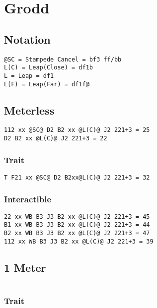 \documentclass[main.tex]{subfiles}
\begin{document}
\chapter{Grodd}

\section{Notation}
\begin{lstlisting}[language=FG]
@SC = Stampede Cancel = bf3 ff/bb
L(C) = Leap(Close) = df1b
L = Leap = df1
L(F) = Leap(Far) = df1f@
\end{lstlisting}
\section{Meterless}


\begin{lstlisting}[language=FG]
112 xx @SC@ D2 B2 xx @L(C)@ J2 221+3 = 25
D2 B2 xx @L(C)@ J2 221+3 = 22
\end{lstlisting}

\subsection{Trait}

\begin{lstlisting}[language=FG]
T F21 xx @SC@ D2 B2xx@L(C)@ J2 221+3 = 32
\end{lstlisting}


\subsection{Interactible}
\begin{lstlisting}[language=FG]
22 xx WB B3 J3 B2 xx @L(C)@ J2 221+3 = 45
B1 xx WB B3 J3 B2 xx @L(C)@ J2 221+3 = 44
B2 xx WB B3 J3 B2 xx @L(C)@ J2 221+3 = 47
112 xx WB B3 J3 B2 xx @L(C)@ J2 221+3 = 39
\end{lstlisting}

\section{1 Meter}


\begin{lstlisting}[language=FG]
\end{lstlisting}

\subsection{Trait}
\end{document}
